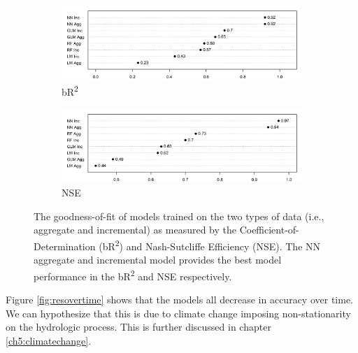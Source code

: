 \begin{figure}
	\centering
	\begin{subfigure}{\textwidth}
  		\centering
 		 \includegraphics[width=\textwidth, trim={0 0 0 0}, clip=true]{plots/rplot26_gof_bR2.png}
  		\caption{bR\textsuperscript{2}}
  		\label{fig:rmse}
	\end{subfigure}%
	\hfill
	\begin{subfigure}{\textwidth}
  		\centering
  		\includegraphics[width=\textwidth, trim={0 0 0 0}, clip=true]{plots/rplot26_gof_NSE.png}
  		\caption{NSE}
  		\label{fig:nse}
	\end{subfigure}
	\caption{The goodness-of-fit of models trained on the two types of data (i.e., aggregate and incremental) as measured by the Coefficient-of-Determination (bR\textsuperscript{2}) and Nash-Sutcliffe Efficiency (NSE). The NN aggregate and incremental model provides the best model performance in the bR\textsuperscript{2} and NSE respectively.}
	\label{fig:gof}
\end{figure}

Figure \ref{fig:resovertime} shows that the models all decrease in accuracy over time. We can hypothesize that this is due to climate change imposing non-stationarity on the hydrologic process. This is further discussed in chapter \ref{ch5:climatechange}.

